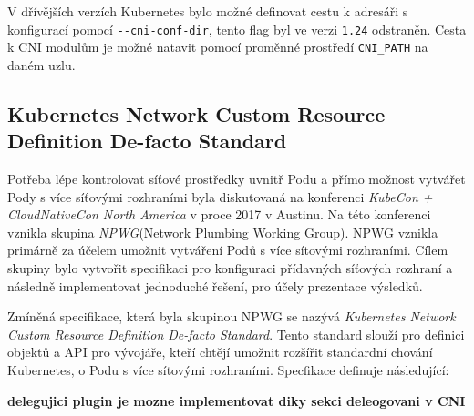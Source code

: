 V dřívějších verzích Kubernetes bylo možné definovat cestu k adresáři s konfigurací pomocí \verb|--cni-conf-dir|, tento flag byl ve verzi \verb|1.24| odstraněn. \cite{k8scirobot_2020_merge} 
\cite{thekubernetesauthors_2022_network} Cesta k CNI modulům je možné natavit pomocí proměnné prostředí \verb|CNI_PATH| na daném uzlu.

\subsection{Kubernetes Network Custom Resource Definition De-facto Standard}\label{sec:kncrdds}
Potřeba lépe kontrolovat síťové prostředky uvnitř Podu a přímo možnost vytvářet Pody s více síťovými rozhraními byla diskutovaná na konferenci \textit{KubeCon + CloudNativeCon North America} v proce 2017 v Austinu\cite{woods_2018_a}. Na této konferenci vznikla skupina \textit{NPWG}(Network Plumbing Working Group). NPWG vznikla primárně za účelem umožnit vytváření Podů s více sítovými rozhraními. Cílem skupiny bylo vytvořit specifikaci pro konfiguraci přídavných síťových rozhraní a následně implementovat jednoduché řešení, pro účely prezentace výsledků.

Zmíněná specifikace, která byla skupinou NPWG se nazývá \textit{Kubernetes Network Custom Resource Definition De-facto Standard}. Tento standard slouží pro definici objektů a API pro vývojáře, kteří chtějí umožnit rozšířit standardní chování Kubernetes, o Podu s více sítovými rozhraními. Specfikace definuje následující:

\textbf{delegujici plugin je mozne implementovat diky sekci deleogovani v CNI}

